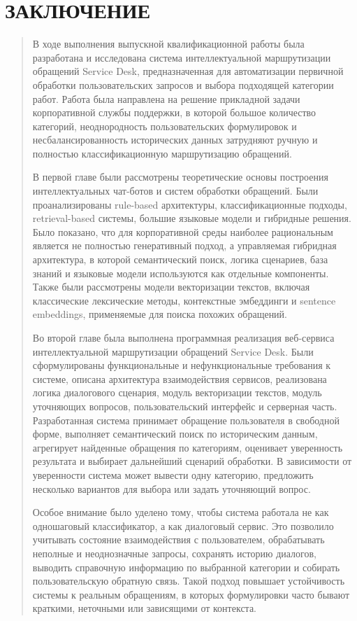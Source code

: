 \hypertarget{ux437ux430ux43aux43bux44eux447ux435ux43dux438ux435}{%
\section{ЗАКЛЮЧЕНИЕ}\label{ux437ux430ux43aux43bux44eux447ux435ux43dux438ux435}}

\begin{quote}
В ходе выполнения выпускной квалификационной работы была разработана и
исследована система интеллектуальной маршрутизации обращений Service
Desk, предназначенная для автоматизации первичной обработки
пользовательских запросов и выбора подходящей категории работ. Работа
была направлена на решение прикладной задачи корпоративной службы
поддержки, в которой большое количество категорий, неоднородность
пользовательских формулировок и несбалансированность исторических данных
затрудняют ручную и полностью классификационную маршрутизацию обращений.

В первой главе были рассмотрены теоретические основы построения
интеллектуальных чат-ботов и систем обработки обращений. Были
проанализированы rule-based архитектуры, классификационные подходы,
retrieval-based системы, большие языковые модели и гибридные решения.
Было показано, что для корпоративной среды наиболее рациональным
является не полностью генеративный подход, а управляемая гибридная
архитектура, в которой семантический поиск, логика сценариев, база
знаний и языковые модели используются как отдельные компоненты. Также
были рассмотрены модели векторизации текстов, включая классические
лексические методы, контекстные эмбеддинги и sentence embeddings,
применяемые для поиска похожих обращений.

Во второй главе была выполнена программная реализация веб-сервиса
интеллектуальной маршрутизации обращений Service Desk. Были
сформулированы функциональные и нефункциональные требования к системе,
описана архитектура взаимодействия сервисов, реализована логика
диалогового сценария, модуль векторизации текстов, модуль уточняющих
вопросов, пользовательский интерфейс и серверная часть. Разработанная
система принимает обращение пользователя в свободной форме, выполняет
семантический поиск по историческим данным, агрегирует найденные
обращения по категориям, оценивает уверенность результата и выбирает
дальнейший сценарий обработки. В зависимости от уверенности система
может вывести одну категорию, предложить несколько вариантов для выбора
или задать уточняющий вопрос.

Особое внимание было уделено тому, чтобы система работала не как
одношаговый классификатор, а как диалоговый сервис. Это позволило
учитывать состояние взаимодействия с пользователем, обрабатывать
неполные и неоднозначные запросы, сохранять историю диалогов, выводить
справочную информацию по выбранной категории и собирать пользовательскую
обратную связь. Такой подход повышает устойчивость системы к реальным
обращениям, в которых формулировки часто бывают краткими, неточными или
зависящими от контекста.


\end{quote}
